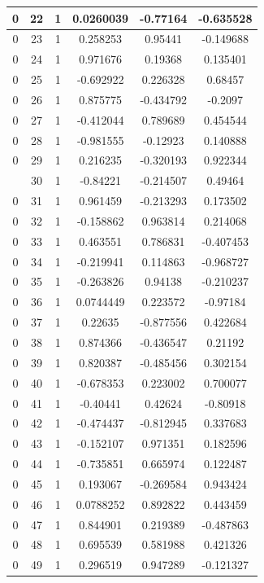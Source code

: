 \documentclass[12pt,a4paper]{article}
\numberwithin{equation}{section}
\numberwithin{figure}{section}
\numberwithin{table}{section}
\begin{document}
\begin{longtable}{|c|c|c|c|c|c|}
0 & 22 & 1 & 0.0260039 & -0.77164 & -0.635528 \\ \hline
0 & 23 & 1 & 0.258253 & 0.95441 & -0.149688 \\ \hline
0 & 24 & 1 & 0.971676 & 0.19368 & 0.135401 \\ \hline
0 & 25 & 1 & -0.692922 & 0.226328 & 0.68457 \\ \hline
0 & 26 & 1 & 0.875775 & -0.434792 & -0.2097 \\ \hline
0 & 27 & 1 & -0.412044 & 0.789689 & 0.454544 \\ \hline
0 & 28 & 1 & -0.981555 & -0.12923 & 0.140888 \\ \hline
0 & 29 & 1 & 0.216235 & -0.320193 & 0.922344 \\ \hline
\pagebreak
0 & 30 & 1 & -0.84221 & -0.214507 & 0.49464 \\ \hline
0 & 31 & 1 & 0.961459 & -0.213293 & 0.173502 \\ \hline
0 & 32 & 1 & -0.158862 & 0.963814 & 0.214068 \\ \hline
0 & 33 & 1 & 0.463551 & 0.786831 & -0.407453 \\ \hline
0 & 34 & 1 & -0.219941 & 0.114863 & -0.968727 \\ \hline
0 & 35 & 1 & -0.263826 & 0.94138 & -0.210237 \\ \hline
0 & 36 & 1 & 0.0744449 & 0.223572 & -0.97184 \\ \hline
0 & 37 & 1 & 0.22635 & -0.877556 & 0.422684 \\ \hline
0 & 38 & 1 & 0.874366 & -0.436547 & 0.21192 \\ \hline
0 & 39 & 1 & 0.820387 & -0.485456 & 0.302154 \\ \hline
0 & 40 & 1 & -0.678353 & 0.223002 & 0.700077 \\ \hline
0 & 41 & 1 & -0.40441 & 0.42624 & -0.80918 \\ \hline
0 & 42 & 1 & -0.474437 & -0.812945 & 0.337683 \\ \hline
0 & 43 & 1 & -0.152107 & 0.971351 & 0.182596 \\ \hline
0 & 44 & 1 & -0.735851 & 0.665974 & 0.122487 \\ \hline
0 & 45 & 1 & 0.193067 & -0.269584 & 0.943424 \\ \hline
0 & 46 & 1 & 0.0788252 & 0.892822 & 0.443459 \\ \hline
0 & 47 & 1 & 0.844901 & 0.219389 & -0.487863 \\ \hline
0 & 48 & 1 & 0.695539 & 0.581988 & 0.421326 \\ \hline
0 & 49 & 1 & 0.296519 & 0.947289 & -0.121327 \\ \hline

\end{longtable}
\end{document}
